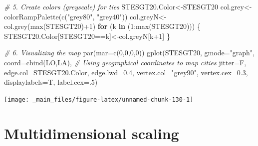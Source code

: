 \documentclass[
  notitlepage,
  onecolumn,
  openany]{book}
\newenvironment{Shaded}{\begin{snugshade}}{\end{snugshade}}
\newcommand{\AttributeTok}[1]{\textcolor[rgb]{0.77,0.63,0.00}{#1}}
\newcommand{\CommentTok}[1]{\textcolor[rgb]{0.56,0.35,0.01}{\textit{#1}}}
\newcommand{\ControlFlowTok}[1]{\textcolor[rgb]{0.13,0.29,0.53}{\textbf{#1}}}
\newcommand{\DecValTok}[1]{\textcolor[rgb]{0.00,0.00,0.81}{#1}}
\newcommand{\FloatTok}[1]{\textcolor[rgb]{0.00,0.00,0.81}{#1}}
\newcommand{\FunctionTok}[1]{\textcolor[rgb]{0.00,0.00,0.00}{#1}}
\newcommand{\NormalTok}[1]{#1}
\newcommand{\OtherTok}[1]{\textcolor[rgb]{0.56,0.35,0.01}{#1}}
\newcommand{\SpecialCharTok}[1]{\textcolor[rgb]{0.00,0.00,0.00}{#1}}
\newcommand{\StringTok}[1]{\textcolor[rgb]{0.31,0.60,0.02}{#1}}
\begin{document}
\begin{Shaded}
\begin{Highlighting}[]
\CommentTok{\# 5. Create colors (greyscale) for ties}
\NormalTok{STESGT20.Color}\OtherTok{\textless{}{-}}\NormalTok{STESGT20}
\NormalTok{col.grey}\OtherTok{\textless{}{-}}\FunctionTok{colorRampPalette}\NormalTok{(}\FunctionTok{c}\NormalTok{(}\StringTok{"grey80"}\NormalTok{, }\StringTok{"grey40"}\NormalTok{))}
\NormalTok{col.greyN}\OtherTok{\textless{}{-}}\FunctionTok{col.grey}\NormalTok{(}\FunctionTok{max}\NormalTok{(STESGT20)}\SpecialCharTok{+}\DecValTok{1}\NormalTok{)}
\ControlFlowTok{for}\NormalTok{ (k }\ControlFlowTok{in}\NormalTok{ (}\DecValTok{1}\SpecialCharTok{:}\FunctionTok{max}\NormalTok{(STESGT20)))}
\NormalTok{\{}
\NormalTok{    STESGT20.Color[STESGT20}\SpecialCharTok{==}\NormalTok{k]}\OtherTok{\textless{}{-}}\NormalTok{col.greyN[k}\SpecialCharTok{+}\DecValTok{1}\NormalTok{]}
\NormalTok{\}}
\end{Highlighting}
\end{Shaded}

\begin{Shaded}
\begin{Highlighting}[]
\CommentTok{\# 6. Visualizing the map}
\FunctionTok{par}\NormalTok{(}\AttributeTok{mar=}\FunctionTok{c}\NormalTok{(}\DecValTok{0}\NormalTok{,}\DecValTok{0}\NormalTok{,}\DecValTok{0}\NormalTok{,}\DecValTok{0}\NormalTok{))}
\FunctionTok{gplot}\NormalTok{(STESGT20, }
      \AttributeTok{gmode=}\StringTok{"graph"}\NormalTok{,}
      \AttributeTok{coord=}\FunctionTok{cbind}\NormalTok{(LO,LA), }\CommentTok{\# Using geographical coordinates to map cities}
      \AttributeTok{jitter=}\NormalTok{F,}
      \AttributeTok{edge.col=}\NormalTok{STESGT20.Color,}
      \AttributeTok{edge.lwd=}\FloatTok{0.4}\NormalTok{,}
      \AttributeTok{vertex.col=}\StringTok{"grey90"}\NormalTok{,}
      \AttributeTok{vertex.cex=}\FloatTok{0.3}\NormalTok{,}
      \AttributeTok{displaylabels=}\NormalTok{T, }
      \AttributeTok{label.cex=}\NormalTok{.}\DecValTok{5}\NormalTok{)}
\end{Highlighting}
\end{Shaded}

\begin{center}\texttt{[image: \_main\_files/figure-latex/unnamed-chunk-130-1]} \end{center}

\hypertarget{multidimensional-scaling}{%
\section{Multidimensional scaling}\label{multidimensional-scaling}}
\end{document}

